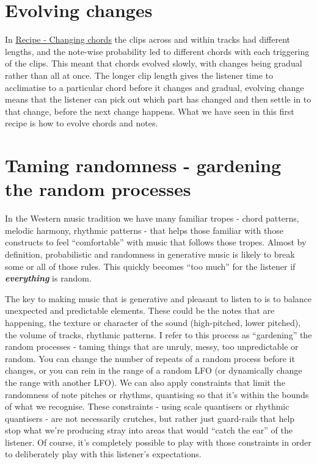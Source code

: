 \documentclass[
  12pt,
  letterpaper,
  oneside,
  open=any]{scrbook}
\begin{document}
\section{Evolving changes}\label{evolving-changes}

In \hyperref[Chapter-001-Recipe-Changing_Chords]{Recipe - Changing
chords} the clips across and within tracks had different lengths, and
the note-wise probability led to different chords with each triggering
of the clips. This meant that chords evolved slowly, with changes being
gradual rather than all at once. The longer clip length gives the
listener time to acclimatise to a particular chord before it changes and
gradual, evolving change means that the listener can pick out which part
has changed and then settle in to that change, before the next change
happens. What we have seen in this first recipe is how to evolve chords
and notes.

\section{Taming randomness - gardening the random
processes}\label{taming-randomness---gardening-the-random-processes}

In the Western music tradition we have many familiar tropes - chord
patterns, melodic harmony, rhythmic patterns - that helps those familiar
with those constructs to feel ``comfortable'' with music that follows
those tropes. Almost by definition, probabilistic and randomness in
generative music is likely to break some or all of those rules. This
quickly becomes ``too much'' for the listener if
\textbf{\emph{everything}} is random.

The key to making music that is generative and pleasant to listen to is
to balance unexpected and predictable elements. These could be the notes
that are happening, the texture or character of the sound (high-pitched,
lower pitched), the volume of tracks, rhythmic patterns. I refer to this
process as ``gardening'' the random processes - taming things that are
unruly, messy, too unpredictable or random. You can change the number of
repeats of a random process before it changes, or you can rein in the
range of a random LFO (or dynamically change the range with another
LFO). We can also apply constraints that limit the randomness of note
pitches or rhythms, quantising so that it's within the bounds of what we
recognise. These constraints - using scale quantisers or rhythmic
quantisers - are not necessarily crutches, but rather just guard-rails
that help stop what we're producing stray into areas that would ``catch
the ear'' of the listener. Of course, it's completely possible to play
with those constraints in order to deliberately play with this
listener's expectations.
\end{document}
